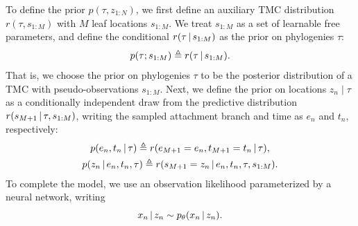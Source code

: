 To define the \acronym\;prior $p(\tau, z_{1:N})$, we first define an auxiliary TMC distribution $r(\tau, s_{1:M})$ with $M$ leaf locations $s_{1:M}$.
We treat $s_{1:M}$ as a set of learnable free parameters, and define the conditional $r(\tau \,|\, s_{1:M})$ as the \acronym\;prior on phylogenies $\tau$:
\begin{equation}
  p(\tau ; s_{1:M}) \triangleq r(\tau \,|\, s_{1:M}).
\end{equation}
That is, we choose the prior on phylogenies $\tau$ to be the posterior distribution of a TMC with pseudo-observations $s_{1:M}$.
Next, we define the \acronym\;prior on locations $z_n\mid \tau$ as a conditionally independent draw from the predictive distribution $r(s_{M+1} \,|\, \tau, s_{1:M})$, writing the sampled attachment branch and time as $e_n$ and $t_n$, respectively:
\begin{gather}
    p(e_n, t_n \,|\, \tau)
    \triangleq r(e_{M+1} = e_n, t_{M+1} = t_n \,|\, \tau),
    \notag
    \\
    p(z_n \,|\, e_n, t_n, \tau)
    \triangleq r(s_{M+1} = z_n \,|\, e_n, t_n, \tau, s_{1:M}).
\end{gather}
To complete the model, we use an observation likelihood parameterized by a neural network, writing
\begin{equation}
    x_n \,|\, z_n \sim p_\theta(x_n \,|\, z_n).
\end{equation}
%
%
